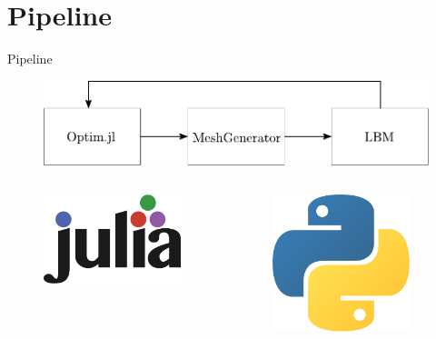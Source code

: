 \documentclass[aspectratio=169,xcolor=dvipsnames]{beamer}
\begin{document}
\section{Pipeline}
\begin{frame}{Pipeline}
	
	\begin{figure}
		\includegraphics[width=0.9\linewidth, trim={0 -0.1cm 0 0}, clip]{Images/pipeline.pdf}
	\end{figure}
	\vspace{-2mm}
	\begin{columns}[T] %
		\begin{column}{.31\textwidth}
			\begin{figure}
				\includegraphics[width=0.5\linewidth, trim={0 0 0 0}, clip]{Images/julia.png}
			\end{figure}
		\end{column}%
		\begin{column}{.31\textwidth}
			\begin{figure}
				\includegraphics[width=0.35\linewidth, trim={0 0 0 0cm}, clip]{Images/python.png}
			\end{figure}
		\end{column}%
		\begin{column}{.31\textwidth}

\end{column}
\end{columns}
\end{frame}
\end{document}

